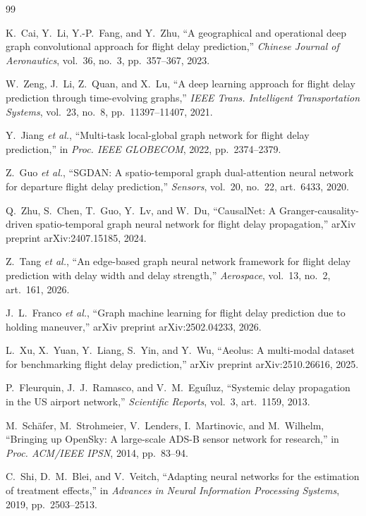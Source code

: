\documentclass[11pt]{article}
\begin{document}
\begin{thebibliography}{99}

K.~Cai, Y.~Li, Y.-P.~Fang, and Y.~Zhu, ``A geographical and operational deep
graph convolutional approach for flight delay prediction,'' \emph{Chinese Journal
of Aeronautics}, vol.~36, no.~3, pp.~357--367, 2023.

W.~Zeng, J.~Li, Z.~Quan, and X.~Lu, ``A deep learning approach for flight delay
prediction through time-evolving graphs,'' \emph{IEEE Trans. Intelligent
Transportation Systems}, vol.~23, no.~8, pp.~11397--11407, 2021.

Y.~Jiang \emph{et al.}, ``Multi-task local-global graph network for flight delay
prediction,'' in \emph{Proc. IEEE GLOBECOM}, 2022, pp.~2374--2379.

Z.~Guo \emph{et al.}, ``SGDAN: A spatio-temporal graph dual-attention neural
network for departure flight delay prediction,'' \emph{Sensors}, vol.~20, no.~22,
art.~6433, 2020.

Q.~Zhu, S.~Chen, T.~Guo, Y.~Lv, and W.~Du, ``CausalNet: A Granger-causality-driven
spatio-temporal graph neural network for flight delay propagation,'' arXiv
preprint arXiv:2407.15185, 2024.

Z.~Tang \emph{et al.}, ``An edge-based graph neural network framework for flight
delay prediction with delay width and delay strength,'' \emph{Aerospace},
vol.~13, no.~2, art.~161, 2026.

J.~L.~Franco \emph{et al.}, ``Graph machine learning for flight delay prediction
due to holding maneuver,'' arXiv preprint arXiv:2502.04233, 2026.

L.~Xu, X.~Yuan, Y.~Liang, S.~Yin, and Y.~Wu, ``Aeolus: A multi-modal dataset for
benchmarking flight delay prediction,'' arXiv preprint arXiv:2510.26616, 2025.

P.~Fleurquin, J.~J.~Ramasco, and V.~M.~Egu\'iluz, ``Systemic delay propagation in
the US airport network,'' \emph{Scientific Reports}, vol.~3, art.~1159, 2013.

M.~Sch\"afer, M.~Strohmeier, V.~Lenders, I.~Martinovic, and M.~Wilhelm,
``Bringing up OpenSky: A large-scale ADS-B sensor network for research,'' in
\emph{Proc. ACM/IEEE IPSN}, 2014, pp.~83--94.

C.~Shi, D.~M.~Blei, and V.~Veitch, ``Adapting neural networks for the estimation
of treatment effects,'' in \emph{Advances in Neural Information Processing
Systems}, 2019, pp.~2503--2513.


\end{thebibliography}
\end{document}
